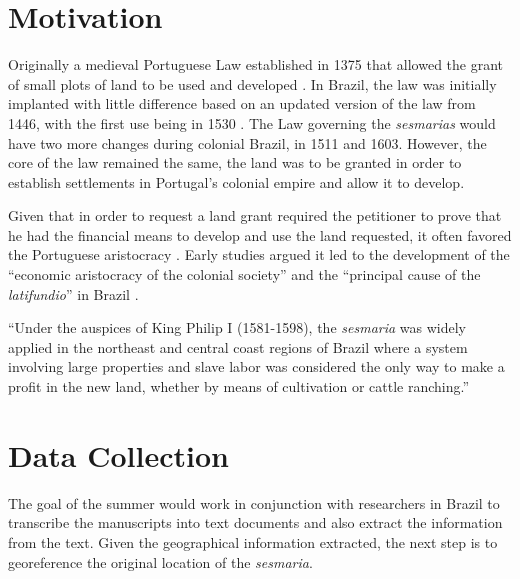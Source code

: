 \documentclass{article}
\begin{document}
\section{Motivation}

Originally a medieval Portuguese Law established in 1375 that allowed the grant of small plots of land to be used and developed \parencite[p.~16]{Diegues_Junior1959-ba}. In Brazil, the law was initially implanted with little difference based on an updated version of the law from 1446, with the first use being in 1530 \parencite[p.~16]{Diegues_Junior1959-ba}. The Law governing the \textit{sesmarias} would have two more changes during colonial Brazil, in 1511 and 1603. However, the core of the law remained the same, the land was to be granted in order to establish settlements in Portugal's colonial empire and allow it to develop. 

Given that in order to request a land grant required the petitioner to prove that he had the financial means to develop and use the land requested, it often favored the Portuguese aristocracy \parencite{Lobb1976-mc}. Early studies argued it led to the development of the ``economic aristocracy of the colonial society'' and the ``principal cause of the \textit{latifundio}'' in Brazil \parencites[p.~36]{Lima2002-kd}[p.~48]{Da_Costa_Porto1979-dz}. 

``Under the auspices of King Philip I (1581-1598), the \textit{sesmaria} was widely applied in the northeast and central coast regions of Brazil where a system involving large properties and slave labor was considered the only way to make a profit in the new land, whether by means of cultivation or cattle ranching.''\parencite{Lobb1976-mc}

\section{Data Collection}

The goal of the summer would work in conjunction with researchers in Brazil to transcribe the manuscripts into text documents and also extract the information from the text. Given the geographical information extracted, the next step is to georeference the original location of the \textit{sesmaria}. 

\newpage


\printbibliography

\appendix
\end{document}
